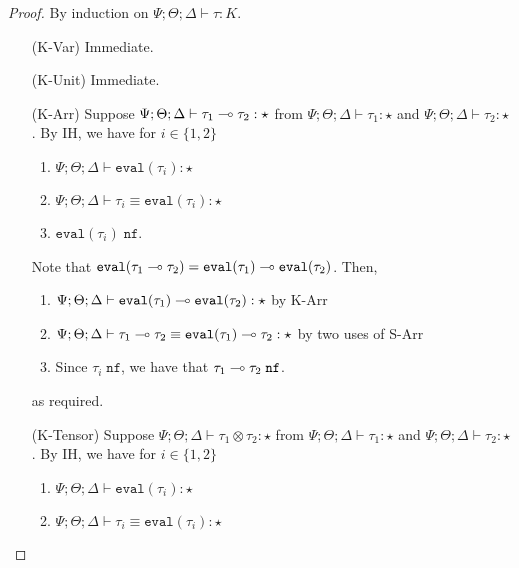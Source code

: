 \begin{proof}

By induction on $\Psi ; \Theta ; \Delta \vdash \tau : K$.

\begin{enumerate}
  \item[(K-Var)] Immediate.
  \item[(K-Unit)] Immediate.  
  \item[(K-Arr)] Suppose ${\Psi ; \Theta ; \Delta \vdash \tau_1 \multimap \tau_2 : \star}$ from $\Psi ; \Theta ; \Delta \vdash \tau_1 : \star$ and  $\Psi ; \Theta ; \Delta \vdash \tau_2 : \star$. By IH, we have for $i \in \{1,2\}$
  \begin{enumerate}[1.]
    \item $\Psi ; \Theta ; \Delta \vdash \texttt{eval}(\tau_i) : \star$
    \item $\Psi ; \Theta ; \Delta \vdash \tau_i \equiv \texttt{eval}(\tau_i) : \star$
    \item $\texttt{eval}(\tau_i) \; \texttt{nf}$.
  \end{enumerate}
  Note that $\texttt{eval}(\tau_1 \multimap \tau_2) = \texttt{eval}(\tau_1) \multimap \texttt{eval}(\tau_2)$. Then,
  \begin{enumerate}[1.]
    \item ${\Psi ; \Theta ; \Delta \vdash \texttt{eval}(\tau_1) \multimap \texttt{eval}(\tau_2) : \star}$ by K-Arr
    \item $\Psi ; \Theta ; \Delta \vdash \tau_1 \multimap \tau_2 \equiv \texttt{eval}(\tau_1) \multimap \tau_2 : \star$ by two uses of S-Arr
    \item Since $\tau_i \; \texttt{nf}$, we have that $\tau_1 \multimap \tau_2 \; \texttt{nf}$.
  \end{enumerate}
  as required.
  \item[(K-Tensor)] Suppose ${\Psi ; \Theta ; \Delta \vdash \tau_1 \otimes \tau_2 : \star}$ from $\Psi ; \Theta ; \Delta \vdash \tau_1 : \star$ and  $\Psi ; \Theta ; \Delta \vdash \tau_2 : \star$. By IH, we have for $i \in \{1,2\}$
  \begin{enumerate}[1.]
    \item $\Psi ; \Theta ; \Delta \vdash \texttt{eval}(\tau_i) : \star$
    \item $\Psi ; \Theta ; \Delta \vdash \tau_i \equiv \texttt{eval}(\tau_i) : \star$

\end{enumerate}
\end{enumerate}
\end{proof}
